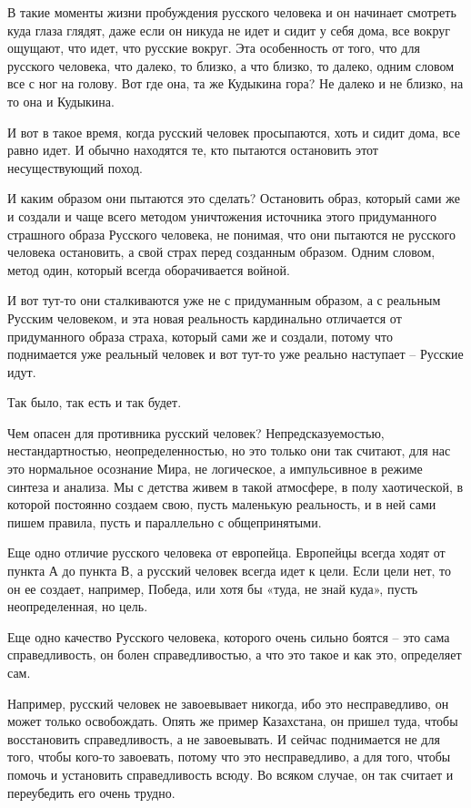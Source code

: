 В такие моменты жизни пробуждения русского человека и он начинает смотреть куда
глаза глядят, даже если он никуда не идет и сидит у себя дома, все вокруг
ощущают, что идет, что русские вокруг. Эта особенность от того, что для
русского человека, что далеко, то близко, а что близко, то далеко, одним словом
все с ног на голову. Вот где она, та же Кудыкина гора? Не далеко и не близко,
на то она и Кудыкина.

И вот в такое время, когда русский человек просыпаются, хоть и сидит дома, все
равно идет. И обычно находятся те, кто пытаются остановить этот несуществующий
поход.

И каким образом они пытаются это сделать? Остановить образ, который сами же и
создали и чаще всего методом уничтожения источника этого придуманного страшного
образа Русского человека, не понимая, что они пытаются не русского человека
остановить, а свой страх перед созданным образом. Одним словом, метод один,
который всегда оборачивается войной.

\begin{zznagolos}
И вот тут-то они сталкиваются уже не с придуманным образом, а с реальным
Русским человеком, и эта новая реальность кардинально отличается от
придуманного образа страха, который сами же и создали, потому что поднимается
уже реальный человек и вот тут-то уже реально наступает – Русские идут.	
\end{zznagolos}

Так было, так есть и так будет.

Чем опасен для противника русский человек? Непредсказуемостью,
нестандартностью, неопределенностью, но это только они так считают, для нас это
нормальное осознание Мира, не логическое, а импульсивное в режиме синтеза и
анализа. Мы с детства живем в такой атмосфере, в полу хаотической, в которой
постоянно создаем свою, пусть маленькую реальность, и в ней сами пишем правила,
пусть и параллельно с общепринятыми.

Еще одно отличие русского человека от европейца. Европейцы всегда ходят от
пункта А до пункта В, а русский человек всегда идет к цели. Если цели нет, то
он ее создает, например, Победа, или хотя бы «туда, не знай куда», пусть
неопределенная, но цель.

Еще одно качество Русского человека, которого очень сильно боятся – это сама
справедливость, он болен справедливостью, а что это такое и как это, определяет
сам.

Например, русский человек не завоевывает никогда, ибо это несправедливо, он
может только освобождать. Опять же пример Казахстана, он пришел туда, чтобы
восстановить справедливость, а не завоевывать. И сейчас поднимается не для
того, чтобы кого-то завоевать, потому что это несправедливо, а для того, чтобы
помочь и установить справедливость всюду. Во всяком случае, он так считает и
переубедить его очень трудно.

